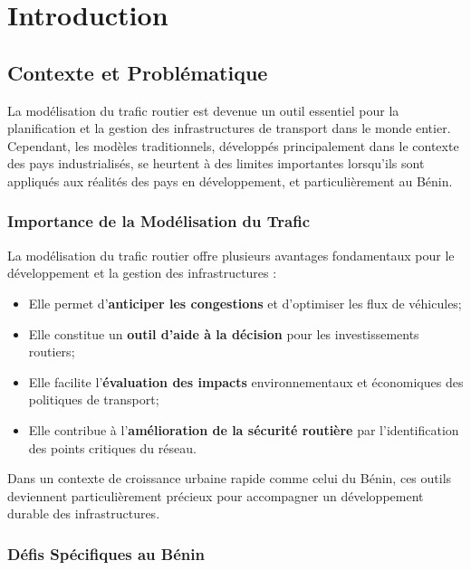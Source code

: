 \chapter{Introduction}
\label{chap:introduction}

\section{Contexte et Problématique}
\label{sec:contexte}

La modélisation du trafic routier est devenue un outil essentiel pour la planification et la gestion des infrastructures de transport dans le monde entier. Cependant, les modèles traditionnels, développés principalement dans le contexte des pays industrialisés, se heurtent à des limites importantes lorsqu'ils sont appliqués aux réalités des pays en développement, et particulièrement au Bénin.

\subsection{Importance de la Modélisation du Trafic}
\label{subsec:importance}

La modélisation du trafic routier offre plusieurs avantages fondamentaux pour le développement et la gestion des infrastructures :

\begin{itemize}
\item Elle permet d'\textbf{anticiper les congestions} et d'optimiser les flux de véhicules;
\item Elle constitue un \textbf{outil d'aide à la décision} pour les investissements routiers;
\item Elle facilite l'\textbf{évaluation des impacts} environnementaux et économiques des politiques de transport;
\item Elle contribue à l'\textbf{amélioration de la sécurité routière} par l'identification des points critiques du réseau.
\end{itemize}

Dans un contexte de croissance urbaine rapide comme celui du Bénin, ces outils deviennent particulièrement précieux pour accompagner un développement durable des infrastructures.

\subsection{Défis Spécifiques au Bénin}
\label{subsec:defis_benin}

